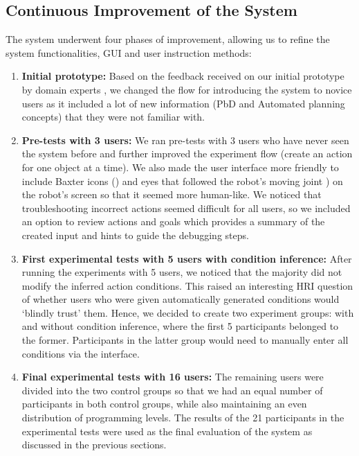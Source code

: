 \subsection{Continuous Improvement of the System}
The system underwent four phases of improvement, allowing us to refine the system functionalities, GUI and user instruction methods:
\begin{enumerate}
	\item {\textbf{Initial prototype:}
		Based on the feedback received on our initial prototype by domain experts %
		, we changed the flow for introducing the system to novice users as it included a lot of new information (\eg PbD and Automated planning concepts) that they were not familiar with.
	}
	\item {\textbf{Pre-tests with 3 users:}
		We ran pre-tests with 3 users who have never seen the system before and further improved the experiment flow (\eg create an action for one object at a time).
		We also made the user interface more friendly to include Baxter icons () and eyes that followed the robot's moving joint \cite{baxtereyes}) on the robot's screen so that it seemed more human-like.
		We noticed that troubleshooting incorrect actions seemed difficult for all users, so we included an option to review actions and goals which provides a summary of the created input and hints to guide the debugging steps.}
	\item {\textbf{First experimental tests with 5 users with condition inference:}
		After running the experiments with 5 users, we noticed that the majority did not modify the inferred action conditions.
		This raised an interesting HRI question of whether users who were given automatically generated conditions would `blindly trust' them.
		Hence, we decided to create two experiment groups: with and without condition inference, where the first 5 participants belonged to the former.
		Participants in the latter group would need to manually enter all conditions via the interface. }
	\item {\textbf{Final experimental tests with 16 users:}
		The remaining users were divided into the two control groups so that we had an equal number of participants in both control groups, while also maintaining an even distribution of programming levels.
		The results of the 21 participants in the experimental tests were used as the final evaluation of the system as discussed in the previous sections.
	}
\end{enumerate}

